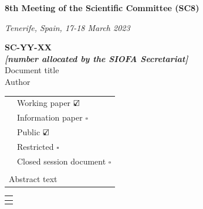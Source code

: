 \documentclass[english,12pt,a4paper,final,twoside,titlepage,pdftex]{article}
\newcommand\CheckBoxTick{$\text{\rlap{$\checkmark$}}\square$}
\newcommand\CheckBoxUntick{$\square$}
\begin{document}
	\sloppy %

	
    \begin{center}
    \thispagestyle{firststyle}
    \vspace*{2cm}
	\small{\textbf{8th Meeting of the Scientific Committee (SC8)}}

	\vspace*{0.25cm}
	\emph{Tenerife, Spain, 17-18 March 2023}
	
	\vspace*{1cm}
	\textbf{SC-YY-XX\\ \emph{[number allocated by the SIOFA Secretariat]}}\\
	\vspace*{0.5cm}	
	\huge{Document title} \\
	\vspace*{1cm}	
	\large{Author}
    \end{center}

	\begin{table}[H]
	  \begin{tabular}{|m{4cm}|m{10cm}|}
	  	\hline
	  	\textbf{\color{blue}{Document type}} &  Working paper \CheckBoxTick \\
	  	& Information paper \CheckBoxUntick \\
        \hline
        \textbf{\color{blue}{Distribution}} & Public \CheckBoxTick \\
        & Restricted \footnotemark[1] \CheckBoxUntick\\
        & Closed session document \footnotemark[2] \CheckBoxUntick\\
	  	\hline
	  	\multicolumn{2}{|l|}{\textbf{\color{blue}{Abstract}}} \\
		\hline
        \multicolumn{2}{|l|}{Abstract text} \\
        \hline
      \end{tabular}%
	\end{table}



	\newpage

	\begin{table}[H]
	  \begin{tabular}{|p{14.5cm}|}
	  	\hline
	  	\textbf{\color{blue}{Recommendations }}\color{blue}{(for proposals and working papers only)} \\
		\hline
         \\
 		\hline
 	  \end{tabular}%
    \end{table}
\end{document}
